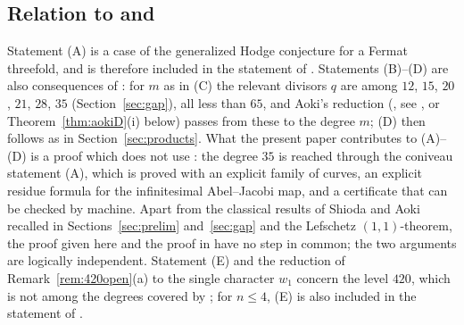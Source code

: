 \documentclass[11pt]{amsart}
\theoremstyle{definition}
\theoremstyle{remark}
\numberwithin{equation}{section}
\begin{document}
\subsection*{Relation to \cite{Ka16} and \cite{MMMV26}} Statement (A) is a case of the generalized Hodge conjecture for a Fermat threefold, and is therefore included in the statement of \cite[Cor.~3.2]{Ka16}. Statements (B)--(D) are also consequences of \cite[Thm.~1.1]{MMMV26}: for $m$ as in (C) the relevant divisors $q$ are among $12$, $15$, $20$, $21$, $28$, $35$ (Section~\ref{sec:gap}), all less than $65$, and Aoki's reduction (\cite{Ao87}, see \cite[Cor.~4.2]{MMMV26}, or Theorem~\ref{thm:aokiD}(i) below) passes from these to the degree $m$; (D) then follows as in Section~\ref{sec:products}. What the present paper contributes to (A)--(D) is a proof which does not use \cite{Ka16}: the degree $35$ is reached through the coniveau statement (A), which is proved with an explicit family of curves, an explicit residue formula for the infinitesimal Abel--Jacobi map, and a certificate that can be checked by machine. Apart from the classical results of Shioda and Aoki recalled in Sections~\ref{sec:prelim} and~\ref{sec:gap} and the Lefschetz $(1,1)$-theorem, the proof given here and the proof in \cite{MMMV26} have no step in common; the two arguments are logically independent. Statement (E) and the reduction of Remark~\ref{rem:420open}(a) to the single character $w_1$ concern the level $420$, which is not among the degrees covered by \cite[Thm.~1.1, Cor.~4.2]{MMMV26}; for $n\le4$, (E) is also included in the statement of \cite[Cor.~3.2]{Ka16}.
\end{document}
